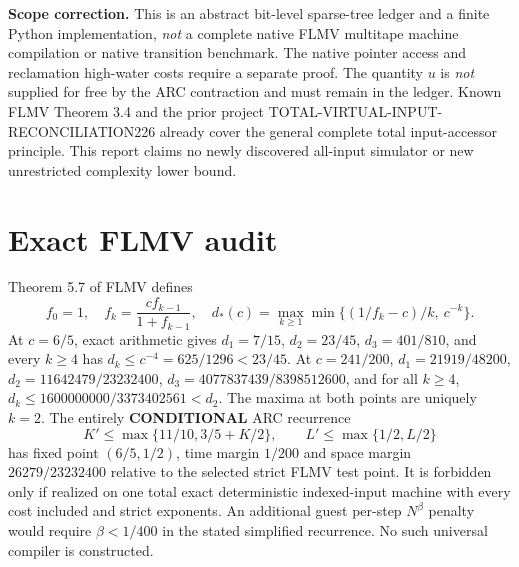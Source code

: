 \documentclass[11pt]{article}
\begin{document}
\noindent\textbf{Scope correction.} This is an abstract bit-level sparse-tree ledger and a finite Python implementation, \emph{not} a complete native FLMV multitape machine compilation or native transition benchmark. The native pointer access and reclamation high-water costs require a separate proof. The quantity $u$ is \emph{not} supplied for free by the ARC contraction and must remain in the ledger. Known FLMV Theorem 3.4 and the prior project TOTAL-VIRTUAL-INPUT-RECONCILIATION226 already cover the general complete total input-accessor principle. This report claims no newly discovered all-input simulator or new unrestricted complexity lower bound.
\section*{Exact FLMV audit}
Theorem 5.7 of FLMV defines
\[
f_0=1,\quad f_k=\frac{cf_{k-1}}{1+f_{k-1}},\quad
d_*(c)=\max_{k\ge1}\min\{(1/f_k-c)/k,\ c^{-k}\}.
\]
At $c=6/5$, exact arithmetic gives $d_1=7/15$, $d_2=23/45$, $d_3=401/810$, and every $k\ge4$ has $d_k\le c^{-4}=625/1296<23/45$. At $c=241/200$, $d_1=21919/48200$, $d_2=11642479/23232400$, $d_3=4077837439/8398512600$, and for all $k\ge4$, $d_k\le 1600000000/3373402561<d_2$. The maxima at both points are uniquely $k=2$.
The entirely \textbf{CONDITIONAL} ARC recurrence
\[
K'\le\max\{11/10,3/5+K/2\},\qquad
L'\le\max\{1/2,L/2\}
\]
has fixed point $(6/5,1/2)$, time margin $1/200$ and space margin $26279/23232400$ relative to the selected strict FLMV test point. It is forbidden only if realized on one total exact deterministic indexed-input machine with every cost included and strict exponents. An additional guest per-step $N^\beta$ penalty would require $\beta<1/400$ in the stated simplified recurrence. No such universal compiler is constructed.
\end{document}
